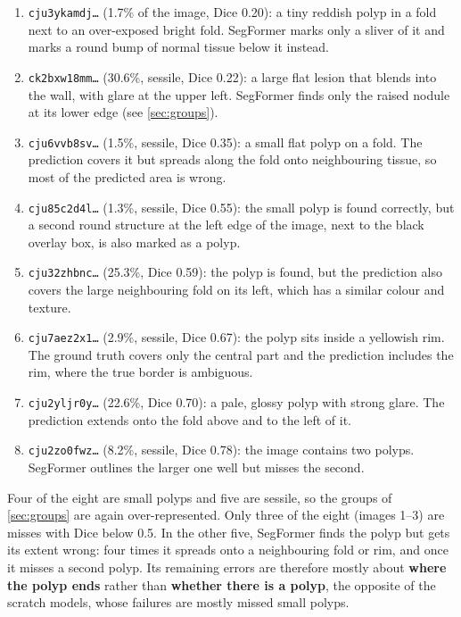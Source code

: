 \begin{enumerate}
  \item \texttt{cju3ykamdj\dots} (1.7\% of the image, Dice 0.20): a tiny reddish polyp in a fold next to an over-exposed bright
        fold. SegFormer marks only a sliver of it and marks a round bump of normal tissue below it instead.
  \item \texttt{ck2bxw18mm\dots} (30.6\%, sessile, Dice 0.22): a large flat lesion that blends into the wall, with glare at the
        upper left. SegFormer finds only the raised nodule at its lower edge (see \cref{sec:groups}).
  \item \texttt{cju6vvb8sv\dots} (1.5\%, sessile, Dice 0.35): a small flat polyp on a fold. The prediction covers it but spreads
        along the fold onto neighbouring tissue, so most of the predicted area is wrong.
  \item \texttt{cju85c2d4l\dots} (1.3\%, sessile, Dice 0.55): the small polyp is found correctly, but a second round structure at
        the left edge of the image, next to the black overlay box, is also marked as a polyp.
  \item \texttt{cju32zhbnc\dots} (25.3\%, Dice 0.59): the polyp is found, but the prediction also covers the large neighbouring fold
        on its left, which has a similar colour and texture.
  \item \texttt{cju7aez2x1\dots} (2.9\%, sessile, Dice 0.67): the polyp sits inside a yellowish rim. The ground truth covers only
        the central part and the prediction includes the rim, where the true border is ambiguous.
  \item \texttt{cju2yljr0y\dots} (22.6\%, Dice 0.70): a pale, glossy polyp with strong glare. The prediction extends onto the fold
        above and to the left of it.
  \item \texttt{cju2zo0fwz\dots} (8.2\%, sessile, Dice 0.78): the image contains two polyps. SegFormer outlines the larger one
        well but misses the second.
\end{enumerate}
Four of the eight are small polyps and five are sessile, so the groups of \cref{sec:groups} are again
over-represented. Only three of the eight (images 1--3) are misses with Dice below 0.5. In the other five,
SegFormer finds the polyp but gets its extent wrong: four times it spreads onto a neighbouring fold or rim, and
once it misses a second polyp. Its remaining errors are therefore mostly about \textbf{where the polyp ends} rather than
\textbf{whether there is a polyp}, the opposite of the scratch models, whose failures are mostly missed small polyps.

